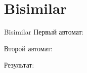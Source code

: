 \section{Bisimilar}
\begin{frame}{Bisimilar}
	Первый автомат:


	Второй автомат:


	Результат:
\end{frame}
